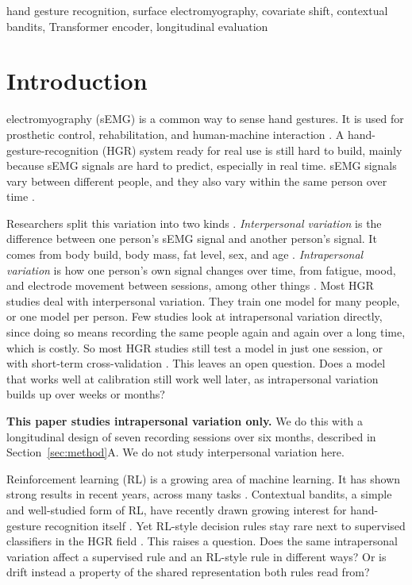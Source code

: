 \documentclass[journal]{IEEEtran}
\begin{document}
\begin{IEEEkeywords}
hand gesture recognition, surface electromyography, covariate shift, contextual bandits, Transformer encoder, longitudinal evaluation
\end{IEEEkeywords}

\section{Introduction}
\label{sec:intro}

 electromyography (sEMG) is a common way to sense hand gestures. It is used for prosthetic control, rehabilitation, and human-machine interaction \cite{Jaramillo2020,Benalcazar2017}. A hand-gesture-recognition (HGR) system ready for real use is still hard to build, mainly because sEMG signals are hard to predict, especially in real time. sEMG signals vary between different people, and they also vary within the same person over time \cite{Jaramillo2020}.

Researchers split this variation into two kinds \cite{Kyranou2018,Huang2017}. \emph{Interpersonal variation} is the difference between one person's sEMG signal and another person's signal. It comes from body build, body mass, fat level, sex, and age \cite{Ulysse2018,Unanyan2021}. \emph{Intrapersonal variation} is how one person's own signal changes over time, from fatigue, mood, and electrode movement between sessions, among other things \cite{Schulte2022,Jiang2013,Zhai2017,He2015}. Most HGR studies deal with interpersonal variation. They train one model for many people, or one model per person. Few studies look at intrapersonal variation directly, since doing so means recording the same people again and again over a long time, which is costly. So most HGR studies still test a model in just one session, or with short-term cross-validation \cite{Jaramillo2020}. This leaves an open question. Does a model that works well at calibration still work well later, as intrapersonal variation builds up over weeks or months?

\textbf{This paper studies intrapersonal variation only.} We do this with a longitudinal design of seven recording sessions over six months, described in Section~\ref{sec:method}A. We do not study interpersonal variation here.

Reinforcement learning (RL) is a growing area of machine learning. It has shown strong results in recent years, across many tasks \cite{Li2010LinUCB,Chu2011Regret}. Contextual bandits, a simple and well-studied form of RL, have recently drawn growing interest for hand-gesture recognition itself \cite{LinPaskettYang2025}. Yet RL-style decision rules stay rare next to supervised classifiers in the HGR field \cite{VasconezV2022,VASCONEZ2023}. This raises a question. Does the same intrapersonal variation affect a supervised rule and an RL-style rule in different ways? Or is drift instead a property of the shared representation both rules read from?
\end{document}
